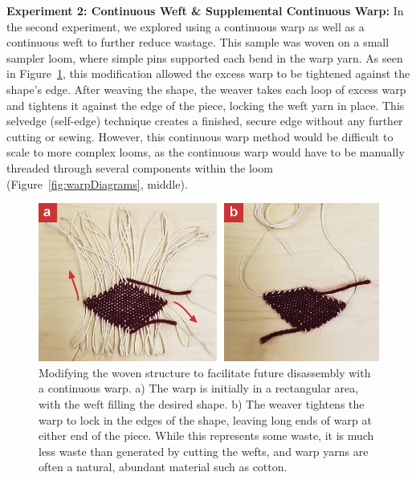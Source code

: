 \textbf{Experiment 2: Continuous Weft \& Supplemental Continuous Warp:} In the second experiment, we explored using a continuous warp as well as a continuous weft to further reduce wastage. This sample was woven on a small sampler loom, where simple pins supported each bend in the warp yarn. %
As seen in Figure~\ref{fig:warptightening}, this modification allowed the excess warp to be tightened against the shape's edge. After weaving the shape, the weaver takes each loop of excess warp and tightens it against the edge of the piece, locking the weft yarn in place. This selvedge (self-edge) technique creates a finished, secure edge without any further cutting or sewing. However, this continuous warp method would be difficult to scale to more complex looms, as the continuous warp would have to be manually threaded through several components within the loom (Figure~\ref{fig:warpDiagrams}, middle).

\begin{figure}
    \centering
    \includegraphics[width=\linewidth]{figs/UF_warptightening.png}
    \caption[Before and after photo of a warp-tightening method to facilitate shaped weaving.]{Modifying the woven structure to facilitate future disassembly with a continuous warp. a) The warp is initially in a rectangular area, with the weft filling the desired shape. b) The weaver tightens the warp to lock in the edges of the shape, leaving long ends of warp at either end of the piece. While this represents some waste, it is much less waste than generated by cutting the wefts, and warp yarns are often a natural, abundant material such as cotton.}
    \label{fig:warptightening}
\end{figure}

